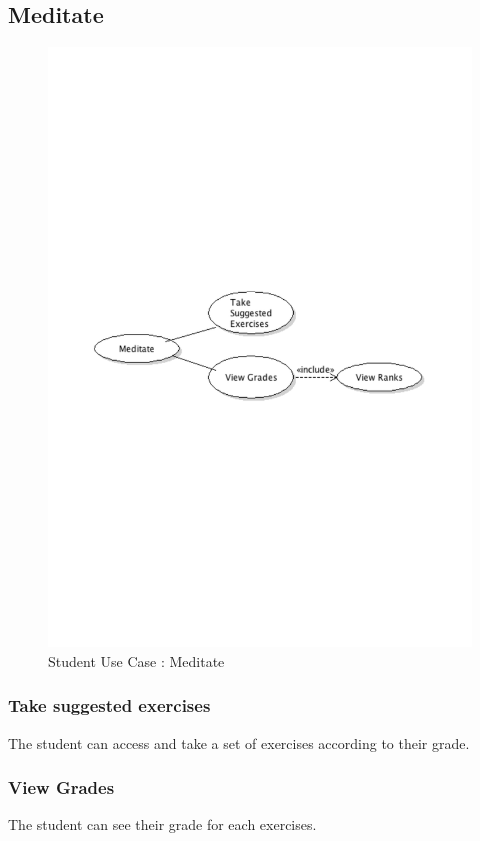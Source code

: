 	\subsection{Meditate}
		\begin{figure}[ht]
			\begin{center}
				\includegraphics[width=\textwidth,  trim=2cm 12cm 2cm 12cm]{UML_figure/UC/student/UC_Student_Meditate.pdf}
				\caption{Student Use Case : Meditate}
			\end{center}
		\end{figure}
		\subsubsection{Take suggested exercises}
			The student can access and take a set of exercises according to their grade.
		\subsubsection{View Grades}
			The student can see their grade for each exercises.
